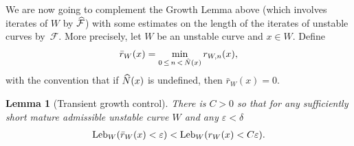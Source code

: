 \documentclass[10pt]{amsart}
\newtheorem{lemm}[theo]{Lemma}\newtheorem{prop}[theo]{Proposition}\newtheorem{coro}[theo]{Corollary}\newtheorem{conj}[theo]{Conjecture}
\theoremstyle{definition}\newtheorem{defi}[theo]{Definition}\newtheorem{rema}[theo]{Remark}\newtheorem{exam}[theo]{Example}\newtheorem{exem}[theo]{Example}\newtheorem{nota}[theo]{Notation}
\newcommand{\eps}{\varepsilon}
\newcommand{\cm}{\mathcal{F}}
\newcommand{\cmp}{\hat\cm}
\newcommand{\admiss}{admissible}
\newcommand{\Np}{\hat N}
\newcommand{\Leb}{\textup{Leb}}
\let\oldhat\hat
\renewcommand*{\hat}[1]{\mathchoice{\widehat{#1}}{\widehat{#1}}{\oldhat{#1}}{\oldhat{#1}}}
\begin{document}
We are now going to complement the Growth Lemma above (which involves iterates of $W$ by $\cmp$) with some estimates on the length of the iterates of unstable curves by~$\cm$. More precisely, let $W$ be an unstable curve and $x\in W$. Define
\begin{align*}
\bar r_{W}(x) = \min_{0\,\le\,n\,<\,\Np(x)}r_{W,n}(x),
\end{align*}
with the convention that if $\Np(x)$ is undefined, then $\bar r_{W}(x) = 0$.

\begin{lemm}[Transient growth control]\label{lem:transient-growth-control}
There is $C > 0$ so that for any sufficiently short mature
\admiss{} unstable curve $W$ and any $\eps<\delta$
\begin{align*}
\Leb_{W}(\bar r_{W}(x) < \eps) < \Leb_{W}(r_{W}(x) < C\eps).
\end{align*}
\end{lemm}
\end{document}
